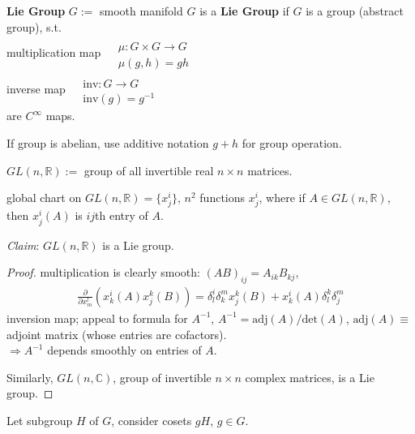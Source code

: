 \begin{definition}
\textbf{Lie Group} $G :=$ smooth manifold $G$ is a \textbf{Lie Group} if $G$ is a group (abstract group), s.t. \\
multiplication map $\begin{aligned} & \quad \\ 
& \mu : G \times G \to G \\
& \mu(g,h) = gh \end{aligned}$ \\
inverse map $\begin{aligned} & \quad \\ 
& \text{inv} : G \to G \\
& \text{inv}(g) = g^{-1} \end{aligned}$ \\
are $C^{\infty}$ maps.

If group is abelian, use additive notation $g+h$ for group operation.
\end{definition}

\begin{definition}[$GL(n, \mathbb{R})$]
	$GL(n,\mathbb{R}) := $ group of all invertible real $n\times n$ matrices. 
	
	global chart on $GL(n, \mathbb{R}) = \lbrace x^i_j \rbrace$, $n^2$ functions $x^i_j$, where if $A \in GL(n,\mathbb{R})$, then $x^i_j(A)$ is $ij$th entry of $A$. 
\end{definition}

\emph{Claim}: $GL(n,\mathbb{R})$ is a Lie group. 

\begin{proof}
multiplication is clearly smooth: $(AB)_{ij} = A_{ik}B_{kj}$, 
\[
\begin{gathered}
	\frac{ \partial }{ \partial x^l_m} (x^i_k(A) x^k_j(B)) = \delta^i_l \delta^m_k x^k_j(B) + x^i_k(A)\delta^k_l \delta^m_j
\end{gathered}
\]
inversion map; appeal to formula for $A^{-1}$, $A^{-1} = \text{adj}(A) / \text{det}(A)$, $\text{adj}(A) \equiv$ adjoint matrix (whose entries are cofactors). \\
$\Longrightarrow A^{-1}$ depends smoothly on entries of $A$.

Similarly, $GL(n,\mathbb{C})$, group of invertible $n\times n$ complex matrices, is a Lie group.
\end{proof}

\label{dgdt:Ex:5.5SubgroupIsOpenAndClosed} Let subgroup $H$ of $G$, consider cosets $gH$, $g\in G$.

